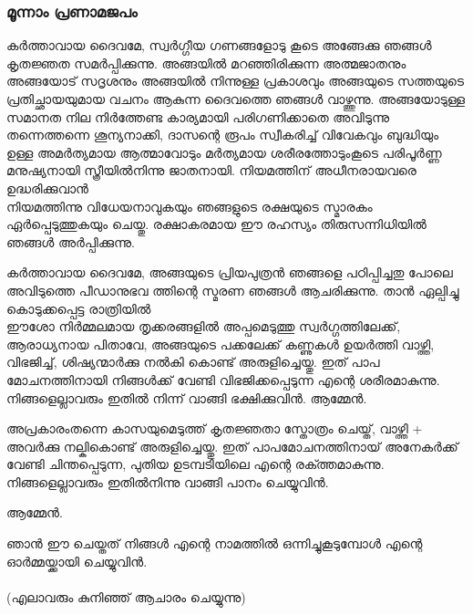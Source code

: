 \documentclass[20pt]{beamer}
\newcommand{\Priest}[1]{\color{white}#1}
\newcommand{\People}[1]{\color{yellow}#1}
\newcommand{\Notice}[1]{\color{lime}(#1)}
\newcommand{\Ammen}{\People{ആമ്മേന്‍.}}
\begin{document}
\begin{frame}[allowframebreaks]
\frametitle{മൂന്നാം പ്രണാമജപം}
\Priest{
കര്‍ത്താവായ ദൈവമേ, സ്വര്‍ഗ്ഗീയ ഗണങ്ങളോടു കൂടെ
അങ്ങേക്കു ഞങ്ങള്‍ കൃതജ്ഞത സമര്‍പ്പിക്കുന്നു.
അങ്ങയില്‍ മറഞ്ഞിരിക്കുന്ന അത്മജാതനും അങ്ങയോട്
സദൃശനും അങ്ങയില്‍ നിന്നുള്ള പ്രകാശവും അങ്ങയുടെ
സത്തയുടെ പ്രതിച്ഛായയുമായ വചനം ആകുന്ന ദൈവത്തെ
ഞങ്ങള്‍ വാഴ്ത്തുന്നു. അങ്ങയോടുള്ള സമാനത നില നിര്‍ത്തേണ്ട
കാര്യമായി പരിഗണിക്കാതെ അവിടുന്നു തന്നെത്തന്നെ
ശൂന്യനാക്കി, ദാസന്റെ രൂപം സ്വീകരിച്ച് വിവേകവും ബുദ്ധിയും ഉള്ള
അമര്‍ത്യമായ ആത്മാവോടും മര്‍ത്യമായ ശരീരത്തോടുംകൂടെ
പരിപൂര്‍ണ്ണ മനുഷ്യനായി സ്ത്രീയില്‍നിന്നു ജാതനായി.
നിയമത്തിന് അധീനരായവരെ ഉദ്ധരിക്കുവാന്‍ \\ \framebreak
നിയമത്തിന്നു വിധേയനാവുകയും ഞങ്ങളുടെ രക്ഷയുടെ സ്മാരകം
ഏര്‍പ്പെടുത്തുകയും ചെയ്തു. രക്ഷാകരമായ ഈ  രഹസ്യം
തിരുസന്നിധിയില്‍ ഞങ്ങള്‍ അര്‍പ്പിക്കുന്നു.

കര്‍ത്താവായ ദൈവമേ, അങ്ങയുടെ പ്രിയപുത്രന്‍ ഞങ്ങളെ
പഠിപ്പിച്ചതു പോലെ അവിടുത്തെ പീഡാനുഭവ ത്തിന്റെ സ്മരണ
ഞങ്ങള്‍ ആചരിക്കുന്നു. താന്‍ ഏല്പിച്ചു കൊടുക്കപ്പെട്ട രാത്രിയില്‍  \\ \framebreak
ഈശോ നിര്‍മ്മലമായ തൃക്കരങ്ങളില്‍ അപ്പമെടുത്തു സ്വര്‍ഗ്ഗത്തിലേക്ക്, 
ആരാധ്യനായ പിതാവേ, അങ്ങയുടെ പക്കലേക്ക് കണ്ണുകള്‍ ഉയര്‍ത്തി
വാഴ്ത്തി, വിഭജിച്ച്, ശിഷ്യന്മാര്‍ക്കു നല്‍കി കൊണ്ട് അരുളിച്ചെയ്തു.
ഇത് പാപ മോചനത്തിനായി നിങ്ങള്‍ക്ക് വേണ്ടി വിഭജിക്കപ്പെടുന്ന
എന്റെ ശരീരമാകുന്നു. നിങ്ങളെല്ലാവരും ഇതില്‍ നിന്ന് വാങ്ങി ഭക്ഷിക്കുവിന്‍.}
\Ammen
\end{frame}

\begin{frame}
\Priest{
അപ്രകാരംതന്നെ കാസയുമെടുത്ത് കൃതജ്ഞതാ സ്തോത്രം ചെയ്ത്,
വാഴ്ത്തി + അവര്‍ക്കു നല്കികൊണ്ട് അരുളിച്ചെയ്തു. ഇത് പാപമോചനത്തിനായ്
അനേകര്‍ക്ക്‌ വേണ്ടി ചിന്തപ്പെടുന്ന, പുതിയ ഉടമ്പടിയിലെ എന്റെ
രക്ത്തമാകുന്നു. നിങ്ങളെല്ലാവരും ഇതില്‍നിന്നു വാങ്ങി പാനം ചെയ്യുവിന്‍.}\par
\Ammen
\end{frame}

\begin{frame}
\Priest{
ഞാന്‍ ഈ ചെയ്തത് നിങ്ങള്‍ എന്റെ നാമത്തില്‍ ഒന്നിച്ചുകൂടുമ്പോള്‍ എന്റെ ഓര്‍മ്മയ്ക്കായി ചെയ്യുവിന്‍.}\\~\\
\Notice{എലാവരും കുനിഞ്ഞ് ആചാരം ചെയ്യുന്നു}
\end{frame}
\end{document}
